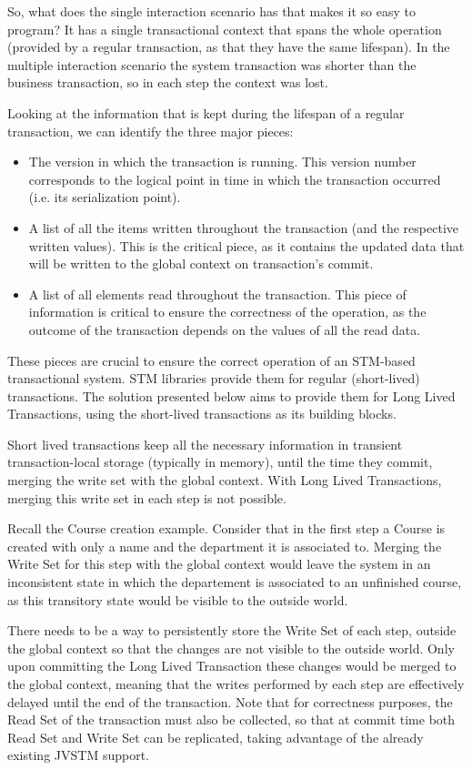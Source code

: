 So, what does the single interaction scenario has that makes it so
easy to program? It has a single transactional context that spans the
whole operation (provided by a regular transaction, as that they have
the same lifespan). In the multiple interaction scenario the system
transaction was shorter than the business transaction, so in each step
the context was lost.

Looking at the information that is kept during the lifespan of a
regular transaction, we can identify the three major pieces:

\begin{itemize}
\item The version in which the transaction is running. This version
  number corresponds to the logical point in time in which the
  transaction occurred (i.e. its serialization point).
\item A list of all the items written throughout the transaction (and
  the respective written values). This is the critical piece, as it
  contains the updated data that will be written to the global context
  on transaction's commit.
\item A list of all elements read throughout the transaction. This
  piece of information is critical to ensure the correctness of the
  operation, as the outcome of the transaction depends on the values
  of all the read data.
\end{itemize}

These pieces are crucial to ensure the correct operation of an
STM-based transactional system. STM libraries provide them for regular
(short-lived) transactions. The solution presented below aims to
provide them for Long Lived Transactions, using the short-lived
transactions as its building blocks.

Short lived transactions keep all the necessary information in
transient transaction-local storage (typically in memory), until the
time they commit, merging the write set with the global context. With
Long Lived Transactions, merging this write set in each step is not
possible. 

Recall the Course creation example. Consider that in the first step a
Course is created with only a name and the department it is associated
to. Merging the Write Set for this step with the global context would
leave the system in an inconsistent state in which the departement is
associated to an unfinished course, as this transitory state would be
visible to the outside world.

There needs to be a way to persistently store the Write Set of each
step, outside the global context so that the changes are not visible
to the outside world. Only upon committing the Long Lived Transaction
these changes would be merged to the global context, meaning that the
writes performed by each step are effectively delayed until the end of
the transaction. Note that for correctness purposes, the Read Set of
the transaction must also be collected, so that at commit time both
Read Set and Write Set can be replicated, taking advantage of the
already existing JVSTM support.

